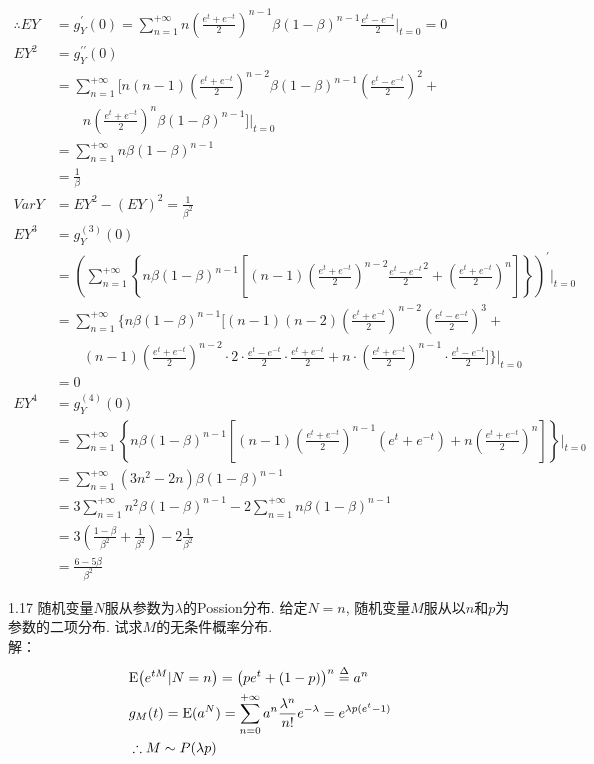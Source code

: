 	\[
	\begin{aligned}
	\therefore EY & = g^{\prime}_Y(0) = \sum^{+\infty}_{n=1} n {\left(\frac{e^t + e^{-t}}{2}\right)}^{n - 1}\beta (1 - \beta)^{n - 1} \frac{e^t - e^{-t}}{2} \bigg|_{t=0} = 0 \\
	EY^2 & = g^{\prime \prime}_Y(0) \\
		& = \sum^{+\infty}_{n=1}\bigg[ n(n-1)\left(\frac{e^t + e^{-t}}{2}\right)^{n-2}\beta (1 - \beta)^{n - 1} \left(\frac{e^t - e^{-t}}{2}\right)^2 + \\
		& \qquad n\left(\frac{e^t + e^{-t}}{2}\right)^n\beta (1 - \beta)^{n - 1} \bigg] \Bigg|_{t=0}\\
		& = \sum^{+\infty}_{n=1}n\beta(1-\beta)^{n-1}\\
		& = \frac{1}{\beta}\\
	VarY & = EY^2-(EY)^2 = \frac{1}{{\beta}^2}\\
	EY^3 & = g^{(3)}_Y(0)\\
		& = \left(\sum^{+\infty}_{n=1}\left\{n\beta(1-\beta)^{n-1}\left[(n-1)\left(\frac{e^t+e^{-t}}{2}\right)^{n-2}{\frac{e^t-e^{-t}}{2}}^2+\left(\frac{e^t+e^{-t}}{2}\right)^n\right]\right\}\right)^{\prime}\Bigg|_{t=0}\\
		& = \sum^{+\infty}_{n=1}\Bigg\{ n\beta{(1-\beta)}^{n-1}\Bigg[(n-1)(n-2)\left(\frac{e^t+e^{-t}}{2}\right)^{n-2}\left(\frac{e^t-e^{-t}}{2}\right)^{3}+ \\
		& \qquad (n-1)\left(\frac{e^t+e^{-t}}{2}\right)^{n-2} \cdot 2 \cdot \frac{e^t-e^{-t}}{2} \cdot \frac{e^t+e^{-t}}{2} + n \cdot \left(\frac{e^t+e^{-t}}{2}\right)^{n-1} \cdot \frac{e^t-e^{-t}}{2} \Bigg] \Bigg\} \Bigg|_{t=0}\\
		& = 0 \\
    EY^4 & = g^{(4)}_Y(0)\\
        & = \sum^{+\infty}_{n=1}\left\{n\beta(1-\beta)^{n-1}\left[(n-1)\left(\frac{e^t+e^{-t}}{2}\right)^{n-1}(e^t+e^{-t})+n\left(\frac{e^t+e^{-t}}{2}\right)^{n}\right]\right\} \Bigg|_{t=0}\\
        & = \sum^{+\infty}_{n=1}(3n^2-2n)\beta(1-\beta)^{n-1}\\
        & = 3\sum^{+\infty}_{n=1}n^2\beta(1-\beta)^{n-1} - 2\sum^{+\infty}_{n=1}n\beta(1-\beta)^{n-1}\\
        & = 3\left(\frac{1-\beta}{{\beta}^2} + \frac{1}{{\beta}^2}\right) - 2\frac{1}{{\beta}^2}\\
        & = \frac{6-5\beta}{{\beta}^2}
	\end{aligned}
	\]


1.17 随机变量$N$服从参数为$\lambda$的Possion分布. 给定$N=n$, 随机变量$M$服从以$n$和$p$为参数的二项分布. 试求$M$的无条件概率分布.\\
解：
\[
\begin{split}
& \mathrm{E}\big(e^{tM}|N=n\big) = \big(pe^t+(1-p)\big)^n \overset{\Delta}{=} a^n\\
& g_M(t) = \mathrm{E}(a^N) = \sum^{+\infty}_{n=0}a^n\frac{\lambda^n}{n!}e^{-\lambda} = e^{\lambda p(e^t-1)}\\
& \therefore M \sim P(\lambda p)
\end{split}
\]

